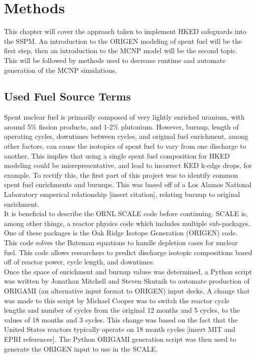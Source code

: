 \chapter{Methods}\label{ch:methods}
This chapter will cover the approach taken to implement HKED safeguards into the SSPM. An introduction to the ORIGEN modeling of spent fuel will be the first step, then an introduction to the MCNP model will be the second topic. This will be followed by methods used to decrease runtime and automate generation of the MCNP simulations.


\section{Used Fuel Source Terms}
Spent nuclear fuel is primarily composed of very lightly enriched uranium, with around 5\% fission products, and 1-2\% plutonium. However, burnup, length of operating cycles, downtimes between cycles, and original fuel enrichment, among other factors, can cause the isotopics of spent fuel to vary from one discharge to another. This implies that using a single spent fuel composition for HKED modeling could be misrepresentative, and lead to incorrect KED k-edge drops, for example. To rectify this, the first part of this project was to identify common spent fuel enrichments and burnups. This was based off of a Los Alamos National Laboratory emperical relationship [insert citation], relating burnup to original enrichment. \\

It is beneficial to describe the ORNL SCALE code before continuing. SCALE is, among other things, a reactor physics code which includes multiple sub-packages. One of these packages is the Oak Ridge Isotope Generation (ORIGEN) code. This code solves the Bateman equations to handle depletion cases for nuclear fuel. This code allows researchers to predict discharge isotopic compositions based off of reactor power, cycle length, and downtimes. \\

Once the space of enrichment and burnup values was determined, a Python script was written by Jonathan Mitchell and Steven Skutnik to automate production of ORIGAMI (an alternative input format to ORIGEN) input decks. A change that was made to this script by Michael Cooper was to switch the reactor cycle lengths and number of cycles from the original 12 months and 5 cycles, to the values of 18 months and 3 cycles. This change was based on the fact that the United States reactors typically operate on 18 month cycles [insert MIT and EPRI references]. The Python ORIGAMI generation script was then used to generate the ORIGEN input to use in the SCALE. \\


